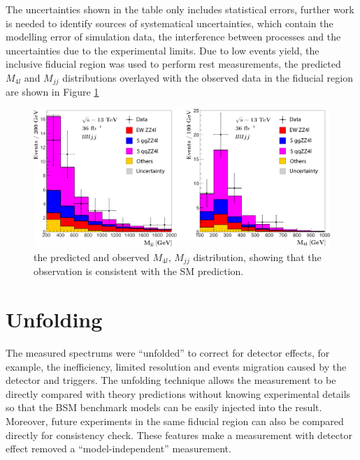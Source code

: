 \documentclass[12pt]{article}
\begin{document}
        The uncertainties shown in the table only includes statistical errors, further work is needed to 
        identify sources of systematical uncertainties, which contain the modelling error of simulation data, 
        the interference between processes and the uncertainties due to the experimental limits. 
        Due to low events yield, the inclusive fiducial region was used to perform rest measurements, 
        the predicted $M_{4l}$ and $M_{jj}$ distributions overlayed with the observed data in the fiducial region are shown in Figure \ref{fig:simpleconsist}        
        \begin{figure}[ht]
            \begin{centering}
            \includegraphics[scale=0.225]{ps/mjj_m4l_equalbins.png}
            \caption{the predicted and observed $M_{4l}$, $M_{jj}$ distribution, showing that the observation is consistent with the SM prediction.}
            \label{fig:simpleconsist}
            \end{centering}
        \end{figure}
    
    \section{Unfolding}
        \par The measured spectrums were ``unfolded'' to correct for detector effects\cite{refId0}, for example, the inefficiency, 
        limited resolution and events migration caused by the detector and triggers. The unfolding technique allows 
        the measurement to be directly compared with theory predictions without knowing experimental details
        so that the BSM benchmark models can be easily injected into the result. Moreover, future experiments 
        in the same fiducial region can also be compared directly for consistency check. These features make a measurement
        with detector effect removed a ``model-independent'' measurement.       
\end{document}
